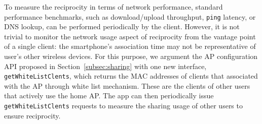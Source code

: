 To measure the reciprocity in terms of network performance, standard performance
benchmarks, such as download/upload throughput, \texttt{ping} latency, or DNS
lookup, can be performed periodically by the \wisefi{} client. However, it is
not trivial to monitor the network usage aspect of reciprocity from the vantage
point of a single client: the smartphone's association time may not be
representative of user's other wireless devices. For this purpose, we argument
the AP configuration API proposed in Section~\ref{subsec:sharing} with one new
interface, \texttt{getWhiteListClents}, which returns the MAC addresses of
clients that associated with the AP through white list mechanism. These are the
clients of other \wisefi{} users that actively use the home AP. The \wisefi{}
app can then periodically issue \texttt{getWhiteListClents} requests to measure
the sharing usage of other \wisefi{} users to ensure reciprocity.
